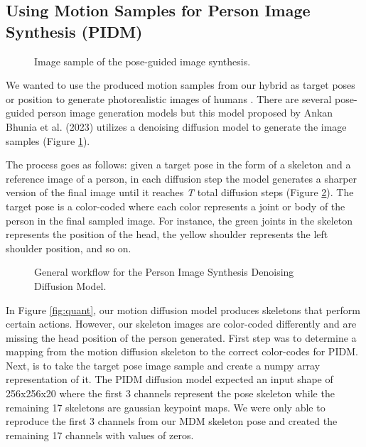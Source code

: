 \documentclass[10pt,twocolumn,letterpaper]{article}
\begin{document}
\subsection{Using Motion Samples for Person Image Synthesis (PIDM)}

\begin{figure}[h]
    \centering

    \caption{Image sample of the pose-guided image synthesis.}
    \label{fig:pidm-0}
\end{figure}

We wanted to use the produced motion samples from our hybrid as target poses or position to generate 
photorealistic images of humans \cite{Bhunia23}. There are several pose-guided person image generation
models but this model proposed by Ankan Bhunia et al. (2023) utilizes a denoising diffusion model to
generate the image samples (Figure \ref{fig:pidm-0}).

The process goes as follows: given a target pose in the form of a skeleton and a reference image 
of a person, in each diffusion step the model generates a sharper version of the final image until it
reaches \emph{T} total diffusion steps (Figure \ref{fig:pidm-1}). The target pose is a color-coded where
each color represents a joint or body of the person in the final sampled image. For instance, the green 
joints in the skeleton represents the position of the head, the yellow shoulder represents the left shoulder 
position, and so on.

\begin{figure}[h]
    \centering

    \caption{General workflow for the Person Image Synthesis Denoising Diffusion Model.}
    \label{fig:pidm-1}
\end{figure}

In Figure \ref{fig:quant}, our motion diffusion model produces skeletons that perform certain actions. 
However, our skeleton images are color-coded differently and are missing the head position of the person 
generated. First step was to determine a mapping from the motion diffusion skeleton to the correct color-codes 
for PIDM. Next, is to take the target pose image sample and create a numpy array representation of it. The PIDM 
diffusion model expected an input shape of 256x256x20 where the first 3 channels represent the pose skeleton 
while the remaining 17 skeletons are gaussian keypoint maps. We were only able to reproduce the first 3 channels 
from our MDM skeleton pose and created the remaining 17 channels with values of zeros.
\end{document}
